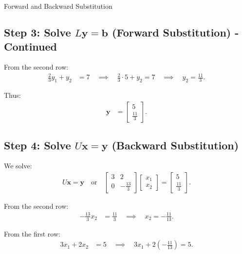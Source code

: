 \documentclass{beamer}
\begin{document}
	\begin{frame}{Forward and Backward Substitution}
		\subsection*{Step 3: Solve $L\mathbf{y} = \mathbf{b}$ (Forward Substitution) - Continued}
		From the second row:
		\begin{align}
			\frac{2}{3} y_1 + y_2 &= 7 \quad \implies \quad \frac{2}{3} \cdot 5 + y_2 = 7 \quad \implies \quad y_2 = \frac{11}{3}.
		\end{align}
		
		Thus:
		\begin{align}
			\mathbf{y} &= \begin{bmatrix} 5 \\ \frac{11}{3} \end{bmatrix}.
		\end{align}
		
		\subsection*{Step 4: Solve $U\mathbf{x} = \mathbf{y}$ (Backward Substitution)}
		We solve:
		\begin{align}
			U\mathbf{x} = \mathbf{y} \quad \text{or} \quad 
			\begin{bmatrix} 3 & 2 \\ 0 & -\frac{13}{3} \end{bmatrix} 
			\begin{bmatrix} x_1 \\ x_2 \end{bmatrix} = 
			\begin{bmatrix} 5 \\ \frac{11}{3} \end{bmatrix}.
		\end{align}
		
		From the second row:
		\begin{align}
			-\frac{13}{3} x_2 &= \frac{11}{3} \quad \implies \quad x_2 = -\frac{11}{13}.
		\end{align}
		
		From the first row:
		\begin{align}
			3x_1 + 2x_2 &= 5 \quad \implies \quad 3x_1 + 2 \left( -\frac{11}{13} \right) = 5.
		\end{align}
	\end{frame}
\end{document}

